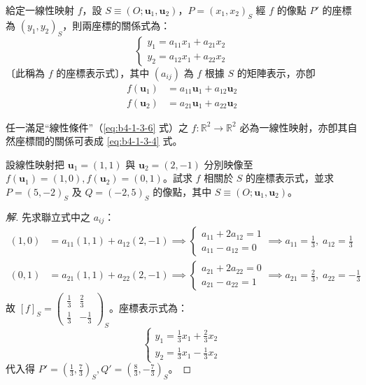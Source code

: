 \begin{proposition}[命題 2]
給定一線性映射 $f$，設 $S \equiv (O; \mathbf{u}_1, \mathbf{u}_2)$，$P = (x_1, x_2)_S$ 經 $f$ 的像點 $P'$ 的座標為 $(y_1, y_2)_S$，則兩座標的關係式為：
\begin{equation}
\begin{cases}
y_1 = a_{11}x_1 + a_{21}x_2 \\
y_2 = a_{12}x_1 + a_{22}x_2
\end{cases} \label{eq:b4-1-3-11}
\end{equation}
〔此稱為 $f$ 的座標表示式〕，其中 $(a_{ij})$ 為 $f$ 根據 $S$ 的矩陣表示，亦卽
\begin{align*}
f(\mathbf{u}_1) &= a_{11}\mathbf{u}_1 + a_{12}\mathbf{u}_2 \\
f(\mathbf{u}_2) &= a_{21}\mathbf{u}_1 + a_{22}\mathbf{u}_2
\end{align*}
\end{proposition}

\begin{theorem}[定理 4]
任一滿足“線性條件”（\eqref{eq:b4-1-3-6} 式）之 $f: \mathbb{R}^2 \to \mathbb{R}^2$ 必為一線性映射，亦卽其自然座標間的關係可表成 \eqref{eq:b4-1-3-4} 式。
\end{theorem}

\begin{example}[例 6]
設線性映射把 $\mathbf{u}_1 = (1, 1)$ 與 $\mathbf{u}_2 = (2, -1)$ 分別映像至 $f(\mathbf{u}_1) = (1, 0), f(\mathbf{u}_2) = (0, 1)$。試求 $f$ 相關於 $S$ 的座標表示式，並求 $P = (5, -2)_S$ 及 $Q = (-2, 5)_S$ 的像點，其中 $S \equiv (O; \mathbf{u}_1, \mathbf{u}_2)$。
\end{example}

\begin{proof}[解]
先求聯立式中之 $a_{ij}$：
\begin{align*}
(1, 0) &= a_{11}(1, 1) + a_{12}(2, -1) \implies \begin{cases} a_{11} + 2a_{12} = 1 \\ a_{11} - a_{12} = 0 \end{cases} \implies a_{11} = \frac{1}{3}, \; a_{12} = \frac{1}{3} \\
(0, 1) &= a_{21}(1, 1) + a_{22}(2, -1) \implies \begin{cases} a_{21} + 2a_{22} = 0 \\ a_{21} - a_{22} = 1 \end{cases} \implies a_{21} = \frac{2}{3}, \; a_{22} = -\frac{1}{3}
\end{align*}
故 $[f]_S = \begin{pmatrix} \frac{1}{3} & \frac{2}{3} \\ \frac{1}{3} & -\frac{1}{3} \end{pmatrix}_S$。座標表示式為：
\[ \begin{cases} y_1 = \frac{1}{3}x_1 + \frac{2}{3}x_2 \\ y_2 = \frac{1}{3}x_1 - \frac{1}{3}x_2 \end{cases} \]
代入得 $P' = (\frac{1}{3}, \frac{7}{3})_S, Q' = (\frac{8}{3}, -\frac{7}{3})_S$。
\end{proof}

